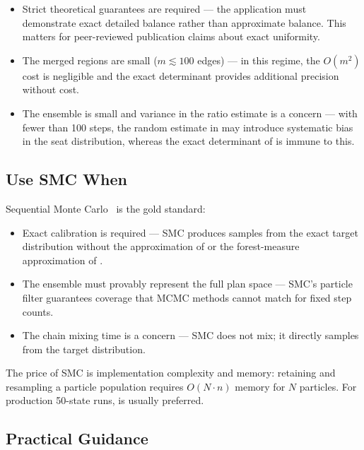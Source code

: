 \begin{itemize}
  \item Strict theoretical guarantees are required --- the application
        must demonstrate exact detailed balance rather than approximate
        balance.
        This matters for peer-reviewed publication claims about exact
        uniformity.

  \item The merged regions are small ($m \lesssim 100$ edges) ---
        in this regime, the $O(m^2)$ cost is negligible and the exact
        determinant provides additional precision without cost.

  \item The ensemble is small and variance in the ratio estimate is a
        concern --- with fewer than 100 steps, the random estimate in
        \mergesplit{} may introduce systematic bias in the seat
        distribution, whereas the exact determinant of \forestrecom{} is
        immune to this.
\end{itemize}

\subsection{Use SMC When}

Sequential Monte Carlo~\citep{dellaLibera2026smc} is the gold standard:

\begin{itemize}
  \item Exact calibration is required --- SMC produces samples from the
        exact target distribution without the approximation of
        \mergesplit{} or the forest-measure approximation of
        \forestrecom{}.

  \item The ensemble must provably represent the full plan space ---
        SMC's particle filter guarantees coverage that MCMC methods
        cannot match for fixed step counts.

  \item The chain mixing time is a concern --- SMC does not mix; it
        directly samples from the target distribution.
\end{itemize}
The price of SMC is implementation complexity and memory: retaining and
resampling a particle population requires $O(N \cdot n)$ memory for $N$
particles.
For production 50-state runs, \mergesplit{} is usually preferred.

\subsection{Practical Guidance}

